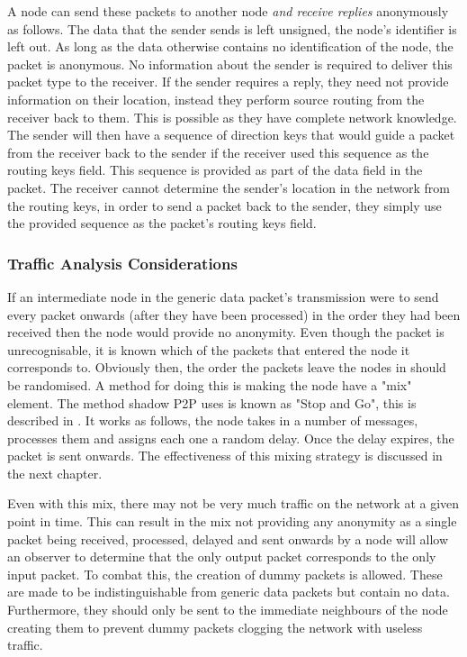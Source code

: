 \documentclass[ %
                    author={Luke Murray},
                supervisor={Dr. Simon Hollis},
                     title={Shadow Peer-to-Peer Networks},
                  subtitle={},
                    degree={MEng},
                      year={2013} ]{thesis}
\begin{document}
A node can send these packets to another node {\em and receive replies} anonymously as follows. The data that the sender sends is left unsigned, the node's identifier is left out. As long as the data otherwise contains no identification of the node, the packet is anonymous. No information about the sender is required to deliver this packet type to the receiver. If the sender requires a reply, they need not provide information on their location, instead they perform source routing from the receiver back to them. This is possible as they have complete network knowledge. The sender will then have a sequence of direction keys that would guide a packet from the receiver back to the sender if the receiver used this sequence as the routing keys field. This sequence is provided as part of the data field in the packet. The receiver cannot determine the sender's location in the network from the routing keys, in order to send a packet back to the sender, they simply use the provided sequence as the packet's routing keys field.

\subsubsection{Traffic Analysis Considerations}

If an intermediate node in the generic data packet's transmission were to send every packet onwards (after they have been processed) in the order they had been received then the node would provide no anonymity. Even though the packet is unrecognisable, it is known which of the packets that entered the node it corresponds to. Obviously then, the order the packets leave the nodes in should be randomised. A method for doing this is making the node have a "mix" element. The method shadow P2P uses is known as "Stop and Go", this is described in \cite{kesdogan1998stop}. It works as follows, the node takes in a number of messages, processes them and assigns each one a random delay. Once the delay expires, the packet is sent onwards. The effectiveness of this mixing strategy is discussed in the next chapter.

Even with this mix, there may not be very much traffic on the network at a given point in time. This can result in the mix not providing any anonymity as a single packet being received, processed, delayed and sent onwards by a node will allow an observer to determine that the only output packet corresponds to the only input packet. To combat this, the creation of dummy packets is allowed. These are made to be indistinguishable from generic data packets but contain no data. Furthermore, they should only be sent to the immediate neighbours of the node creating them to prevent dummy packets clogging the network with useless traffic.
\end{document}
